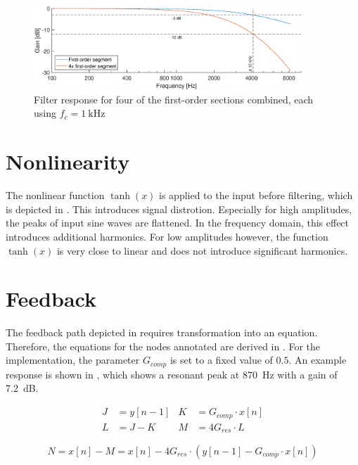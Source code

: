 \documentclass[a4paper, 12pt]{article}
\begin{document}
\begin{figure}
	\centering
	\includegraphics[width=0.9\textwidth]{fourthorder-response.eps}
	\caption{Filter response for four of the first-order sections combined, each using $f_c = \SI{1}{\kilo\hertz}$}
	\label{fig:fourth-order-resp}
\end{figure}

\section{Nonlinearity}
The nonlinear function $\tanh(x)$ is applied to the input before filtering, which is depicted in . This introduces signal distrotion. Especially for high amplitudes, the peaks of input sine waves are flattened. In the frequency domain, this effect introduces additional harmonics. For low amplitudes however, the function $\tanh(x)$ is very close to linear and does not introduce significant harmonics.

\section{Feedback}
The feedback path depicted in  requires transformation into an equation. Therefore, the equations for the nodes annotated are derived in . For the implementation, the parameter $G_{comp}$ is set to a fixed value of $0.5$. An example response is shown in , which shows a resonant peak at \SI{870}{\hertz} with a gain of \SI{7.2}{\deci\bel}.

\begin{align}
	\label{eq:nodes5}
	J &= y[n-1] & K &= G_{comp} \cdot x[n] \\
	\label{eq:nodes6}
	L &= J - K & M &= 4 G_{res} \cdot L
\end{align}
	
\begin{equation}
	\label{eq:nodes7}
	N = x[n] - M = x[n] - 4 G_{res} \cdot (y[n-1] - G_{comp} \cdot x[n])
\end{equation}
\end{document}
